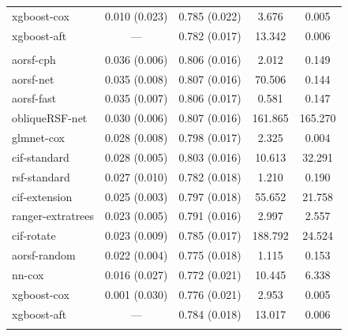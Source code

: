 \documentclass[twoside,11pt]{article}\usepackage[]{graphicx}\usepackage[]{xcolor}
\newenvironment{knitrout}{}{} %
\begin{document}
\begin{knitrout}
\begin{longtable}[t]{lcccc}
\hspace{1em}xgboost-cox & 0.010 (0.023) & 0.785 (0.022) & 3.676 & 0.005\\
\hspace{1em}xgboost-aft & --- & 0.782 (0.017) & 13.342 & 0.006\\
\addlinespace[0.3em]
\multicolumn{5}{l}{\textit{\textbf{JHS; stroke, n = 3639, p = 80}}}\\
\hline
\hspace{1em}aorsf-cph & 0.036 (0.006) & 0.806 (0.016) & 2.012 & 0.149\\
\hspace{1em}aorsf-net & 0.035 (0.008) & 0.807 (0.016) & 70.506 & 0.144\\
\hspace{1em}aorsf-fast & 0.035 (0.007) & 0.806 (0.017) & 0.581 & 0.147\\
\hspace{1em}obliqueRSF-net & 0.030 (0.006) & 0.807 (0.016) & 161.865 & 165.270\\
\hspace{1em}glmnet-cox & 0.028 (0.008) & 0.798 (0.017) & 2.325 & 0.004\\
\hspace{1em}cif-standard & 0.028 (0.005) & 0.803 (0.016) & 10.613 & 32.291\\
\hspace{1em}rsf-standard & 0.027 (0.010) & 0.782 (0.018) & 1.210 & 0.190\\
\hspace{1em}cif-extension & 0.025 (0.003) & 0.797 (0.018) & 55.652 & 21.758\\
\hspace{1em}ranger-extratrees & 0.023 (0.005) & 0.791 (0.016) & 2.997 & 2.557\\
\hspace{1em}cif-rotate & 0.023 (0.009) & 0.785 (0.017) & 188.792 & 24.524\\
\hspace{1em}aorsf-random & 0.022 (0.004) & 0.775 (0.018) & 1.115 & 0.153\\
\hspace{1em}nn-cox & 0.016 (0.027) & 0.772 (0.021) & 10.445 & 6.338\\
\hspace{1em}xgboost-cox & 0.001 (0.030) & 0.776 (0.021) & 2.953 & 0.005\\
\hspace{1em}xgboost-aft & --- & 0.784 (0.018) & 13.017 & 0.006\\
\addlinespace[0.3em]

\end{longtable}
\end{knitrout}
\end{document}
